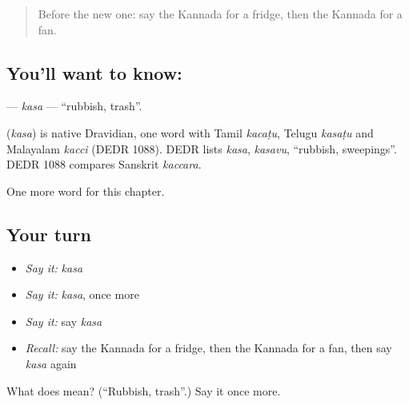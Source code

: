 \label{lesson:KA-C220-kasa}



\begin{quote}
Before the new one: say the Kannada for a fridge, then the Kannada for a fan.
\end{quote}

\subsection*{You'll want to know: }
\textbf{} — \emph{kasa} — \textquotedblleft{}rubbish, trash\textquotedblright{}.

\begin{cousinweb}
\textbf{} (\emph{kasa}) is native Dravidian, one word with Tamil \emph{kacaṭu}, Telugu \emph{kasaṭu} and Malayalam \emph{kacci} (DEDR 1088). DEDR lists \emph{kasa}, \emph{kasavu}, \textquotedblleft{}rubbish, sweepings\textquotedblright{}. DEDR 1088 compares Sanskrit \emph{kaccara}.
\end{cousinweb}

\begin{grammarlens}[title={What you've built}]
One more word for this chapter.
\end{grammarlens}

\subsection*{Your turn}
\begin{itemize}
\raggedright
  \item \emph{Say it:} \emph{kasa}
  \item \emph{Say it:} \emph{kasa}, once more
  \item \emph{Say it:} say \emph{kasa}
  \item \emph{Recall:} say the Kannada for a fridge, then the Kannada for a fan, then say \emph{kasa} again
\end{itemize}

\begin{tcolorbox}[breakable,colback=teal!4,colframe=teal!35!black,title={Before you move on}]
What does  mean? (\textquotedblleft{}Rubbish, trash\textquotedblright{}.) Say it once more.
\end{tcolorbox}
